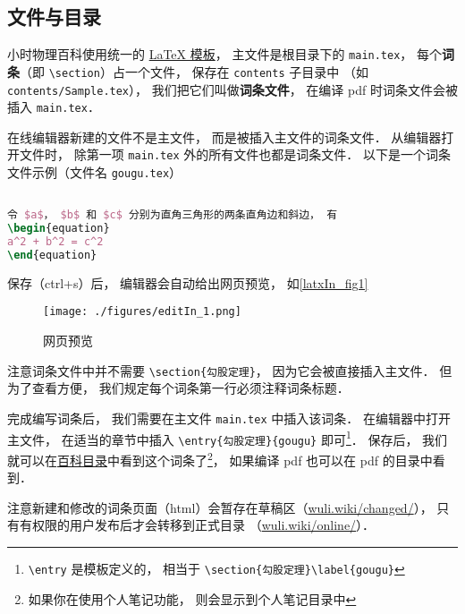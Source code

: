 

\subsection{文件与目录}

小时物理百科使用统一的 \href{https://github.com/MacroUniverse/PhysWiki}{LaTeX 模板}， 主文件是根目录下的 \verb|main.tex|， 每个\textbf{词条}（即 \verb|\section|）占一个文件， 保存在 \verb|contents| 子目录中 （如 \verb|contents/Sample.tex|）， 我们把它们叫做\textbf{词条文件}， 在编译 pdf 时词条文件会被插入 \verb|main.tex|．

在线编辑器新建的文件不是主文件， 而是被插入主文件的词条文件． 从编辑器打开文件时， 除第一项 \verb|main.tex| 外的所有文件也都是词条文件． 以下是一个词条文件示例（文件名 \verb|gougu.tex|）

\begin{lstlisting}[language=latex]
% 勾股定理

令 $a$， $b$ 和 $c$ 分别为直角三角形的两条直角边和斜边， 有
\begin{equation}
a^2 + b^2 = c^2
\end{equation}
\end{lstlisting}
保存（ctrl+s）后， 编辑器会自动给出网页预览， 如\autoref{latxIn_fig1}
\begin{figure}[ht]
\centering
\texttt{[image: ./figures/editIn\_1.png]}
\caption{网页预览} \label{editIn_fig1}
\end{figure}

注意词条文件中并不需要 \verb|\section{勾股定理}|， 因为它会被直接插入主文件． 但为了查看方便， 我们规定每个词条第一行必须注释词条标题．

完成编写词条后， 我们需要在主文件 \verb|main.tex| 中插入该词条． 在编辑器中打开主文件， 在适当的章节中插入 \verb|\entry{勾股定理}{gougu}| 即可\footnote{\verb|\entry| 是模板定义的， 相当于 \verb|\section{勾股定理}\label{gougu}|}． 保存后， 我们就可以在\href{http://wuli.wiki/changed}{百科目录}中看到这个词条了\footnote{如果你在使用个人笔记功能， 则会显示到个人笔记目录中}， 如果编译 pdf 也可以在 pdf 的目录中看到．

注意新建和修改的词条页面（html）会暂存在草稿区（\href{http://wuli.wiki/changed/}{wuli.wiki/changed/}）， 只有有权限的用户发布后才会转移到正式目录 （\href{http://wuli.wiki/online/}{wuli.wiki/online/}）．
